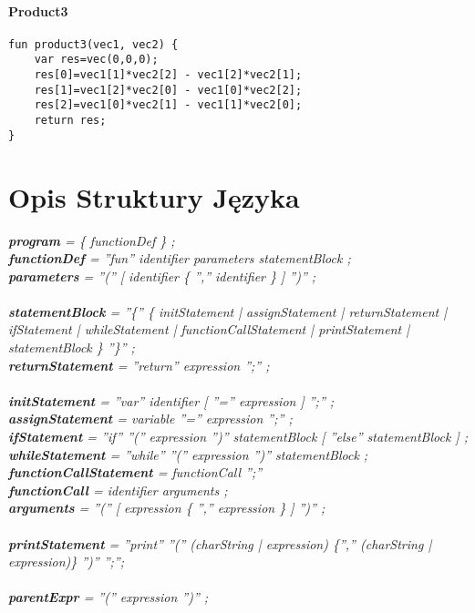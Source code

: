 \documentclass[11pt]{article} %
\begin{document}
\paragraph{Product3}
\begin{verbatim}
fun product3(vec1, vec2) {
    var res=vec(0,0,0);
    res[0]=vec1[1]*vec2[2] - vec1[2]*vec2[1];
    res[1]=vec1[2]*vec2[0] - vec1[0]*vec2[2];
    res[2]=vec1[0]*vec2[1] - vec1[1]*vec2[0];
    return res;
}
\end{verbatim}

\section{Opis Struktury Języka}

\textsl{\textbf{program} = \{ functionDef \} ;\\
\textbf{functionDef} = ''fun'' identifier parameters statementBlock ;\\
\textbf{parameters} = ''('' [ identifier \{ '','' identifier \} ] '')'' ;\\
\\
\textbf{statementBlock} = ''\{'' \{ initStatement | assignStatement | returnStatement |
ifStatement | whileStatement | functionCallStatement |  printStatement | statementBlock \} ''\}'' ;\\
\textbf{returnStatement} = ''return'' expression '';'' ;\\
\\
\textbf{initStatement} = ''var'' identifier [ ''='' expression ] '';'' ;\\
\textbf{assignStatement} = variable ''='' expression '';'' ;\\
\textbf{ifStatement} = ''if'' ''('' expression '')'' statementBlock [ ''else'' statementBlock ] ;\\
\textbf{whileStatement} = ''while'' ''('' expression '')'' statementBlock ;\\
\textbf{functionCallStatement} =  functionCall '';''\\
\textbf{functionCall} = identifier arguments ;\\
\textbf{arguments} = ''('' [ expression \{ '','' expression \} ] '')'' ;\\
\\
\textbf{printStatement} = ''print'' ''('' (charString | expression) \{'','' (charString | expression)\} '')'' '';'';\\
\\
\textbf{parentExpr} = ''('' expression '')'' ;\\
}
\end{document}
